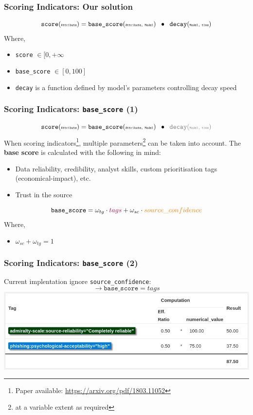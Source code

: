 \begin{frame}
    \frametitle{Scoring Indicators: Our solution}
    $$ \texttt{score}(\texttt{\tiny Attribute}) = \texttt{base\_score}(\texttt{\tiny Attribute, Model}) \;\;\bullet\;\; \texttt{decay}(\texttt{\tiny Model, time}) $$
    Where,\vspace{0.5cm}
    \begin{itemize}
        \item \texttt{score} $ \in [0, +\infty $
        \item \texttt{base\_score} $ \in [0, 100] $
        \item \texttt{decay} is a function defined by model's parameters controlling decay speed
    \end{itemize}
    
\end{frame}

\begin{frame}
    \frametitle{Scoring Indicators: \texttt{base\_score} (1)}
    $$ \texttt{score}(\texttt{\tiny Attribute}) = \texttt{base\_score}(\texttt{\tiny Attribute, Model}) \;\;\bullet\;\; {\color{gray}\texttt{decay}(\texttt{\tiny Model, time})} $$
        When scoring indicators\footnote{Paper available: \url{https://arxiv.org/pdf/1803.11052}}, multiple parameters\footnote{at a variable extent as required} can be taken into account. The {\bf base score} is calculated with the following in mind:
    \begin{itemize}
        \item {\color{purple}Data reliability, credibility, analyst skills, custom prioritisation tags (economical-impact), etc.}
        \item {\color{orange}Trust in the source}
    \end{itemize}
    \vspace{0.3cm}
    $$\texttt{base\_score} = \omega_{tg} \cdot {\color{purple}tags} + \omega_{sc} \cdot {\color{orange}source\_confidence}$$
    Where,
    \begin{itemize}
        \item[] $\omega_{sc} + \omega_{tg} = 1$
    \end{itemize}
\end{frame}

\begin{frame}
    \frametitle{Scoring Indicators: \texttt{base\_score} (2)}
    Current implentation ignore \texttt{source\_confidence}:
    $$\rightarrow \texttt{base\_score} = tags$$
    \includegraphics[width=1.0\linewidth]{pics/bs-computation-steps.png}
\end{frame}

